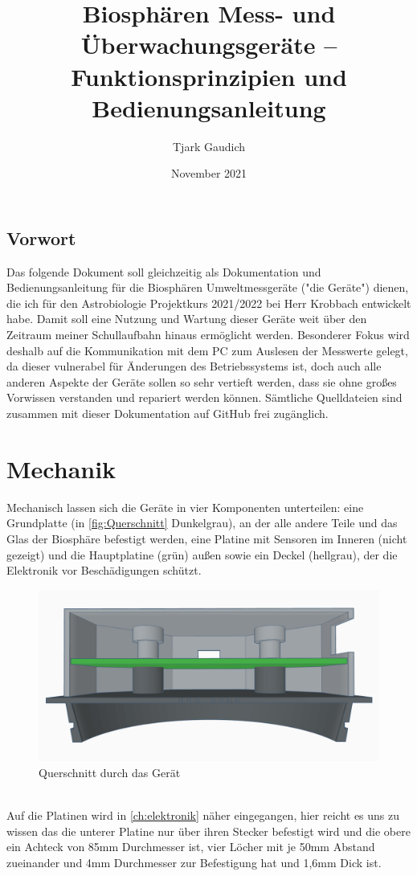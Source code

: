 \documentclass[12pt, a4paper, oneside]{report}
\title{\textbf{Biosphären Mess- und Überwachungsgeräte -- Funktionsprinzipien und Bedienungsanleitung}}
\author{Tjark Gaudich}
\date{November 2021}
\begin{document}
\begin{titlepage}
\maketitle
\thispagestyle{empty}
\end{titlepage}

\section{Vorwort}
Das folgende Dokument soll gleichzeitig als Dokumentation und Bedienungsanleitung für die Biosphären Umweltmessgeräte ("die Geräte") dienen, die ich für den Astrobiologie Projektkurs 2021/2022 bei Herr Krobbach entwickelt habe. Damit soll eine Nutzung und Wartung dieser Geräte weit über den Zeitraum meiner Schullaufbahn hinaus ermöglicht werden. Besonderer Fokus wird deshalb auf die Kommunikation mit dem PC zum Auslesen der Messwerte gelegt, da dieser vulnerabel für Änderungen des Betriebssystems ist, doch auch alle anderen Aspekte der Geräte sollen so sehr vertieft werden, dass sie ohne großes Vorwissen verstanden und repariert werden können. Sämtliche Quelldateien sind zusammen mit dieser Dokumentation auf 
GitHub\cite{Github} frei zugänglich.
\tableofcontents
\listoffigures

\chapter{Mechanik}

Mechanisch lassen sich die Geräte in vier Komponenten unterteilen:
eine Grundplatte (in \autoref{fig:Querschnitt} Dunkelgrau), an der alle andere Teile und das Glas der Biosphäre befestigt werden, eine Platine mit Sensoren im Inneren (nicht gezeigt) und die Hauptplatine (grün) außen sowie ein Deckel (hellgrau), der die Elektronik vor Beschädigungen schützt.
\begin{figure}[h]
	\centering
	\includegraphics[width=1\textwidth]{pic/Querschnitt}
	\caption{Querschnitt durch das Gerät}
	\label{fig:Querschnitt}
\end{figure}
\\Auf die Platinen wird in \autoref{ch:elektronik} näher eingegangen, hier reicht es uns zu wissen das die unterer Platine nur über ihren Stecker befestigt wird und die obere ein Achteck von 85mm Durchmesser ist, vier Löcher mit je 50mm Abstand zueinander und 4mm Durchmesser zur Befestigung hat und 1,6mm Dick ist.
\end{document}

